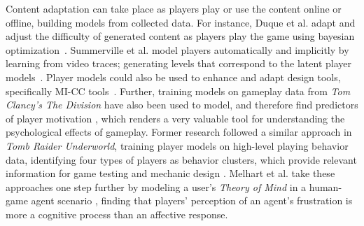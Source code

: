 Content adaptation can take place as players play or use the content online or offline, building models from collected data. For instance, Duque et al. adapt and adjust the difficulty of generated content as players play the game using bayesian optimization~\cite{gonzalez-duque_fast_2021}. Summerville et al. model players automatically and implicitly by learning from video traces; generating levels that correspond to the latent player models~\cite{summerville_learning_2016}. Player models could also be used to enhance and adapt design tools, specifically MI-CC tools~\cite{migkotzidis_susketch_2021,holmgard_automated_2019}. Further, training models on gameplay data from \emph{Tom Clancy's The Division} have also been used to model, and therefore find predictors of player motivation \cite{melhart_your_2019}, which renders a very valuable tool for understanding the psychological effects of gameplay. Former research followed a similar approach in \textit{Tomb Raider Underworld}, training player models on high-level playing behavior data, identifying four types of players as behavior clusters, which provide relevant information for game testing and mechanic design \cite{drachen_player_2009}. Melhart et al. take these approaches one step further by modeling a user's \textit{Theory of Mind} in a human-game agent scenario \cite{melhart_i_2020}, finding that players' perception of an agent's frustration is more a cognitive process than an affective response.




